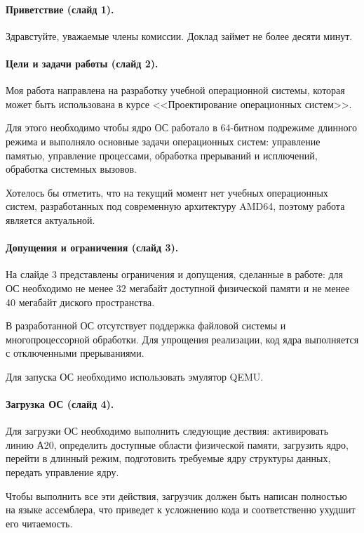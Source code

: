 \documentclass[12pt]{article}
\begin{document}
\paragraph{Приветствие (слайд 1).}
Здравстуйте, уважаемые члены комиссии. Доклад займет не более десяти минут.

\paragraph{Цели и задачи работы (слайд 2).}
Моя работа направлена на разработку учебной операционной системы, которая может
быть использована в курсе <<Проектирование операционных систем>>.

Для этого необходимо чтобы ядро ОС работало в 64-битном подрежиме длинного режима
и выполняло основные задачи операционных систем: управление памятью, управление
процессами, обработка прерываний и исплючений, обработка системных вызовов.

Хотелось бы отметить, что на текущий момент нет учебных операционных систем,
разработанных под современную архитектуру AMD64, поэтому работа является актуальной.

\paragraph{Допущения и ограничения (слайд 3).}
На слайде 3 представлены ограничения и допущения, сделанные в работе: для ОС необходимо
не менее 32 мегабайт доступной физической памяти и не менее 40 мегабайт диского пространства.

В разработанной ОС отсутствует поддержка файловой системы и многопроцессорной обработки.
Для упрощения реализации, код ядра выполняется с отключенными прерываниями.

Для запуска ОС необходимо использовать эмулятор QEMU.

\paragraph{Загрузка ОС (слайд 4).}
Для загрузки ОС необходимо выполнить следующие дествия: активировать линию А20,
определить доступные области физической памяти, загрузить ядро, перейти в длинный
режим, подготовить требуемые ядру структуры данных, передать управление ядру.

Чтобы выполнить все эти действия, загрузчик должен быть написан полностью на языке
ассемблера, что приведет к усложнению кода и соответственно ухудшит его читаемость.
\end{document}
